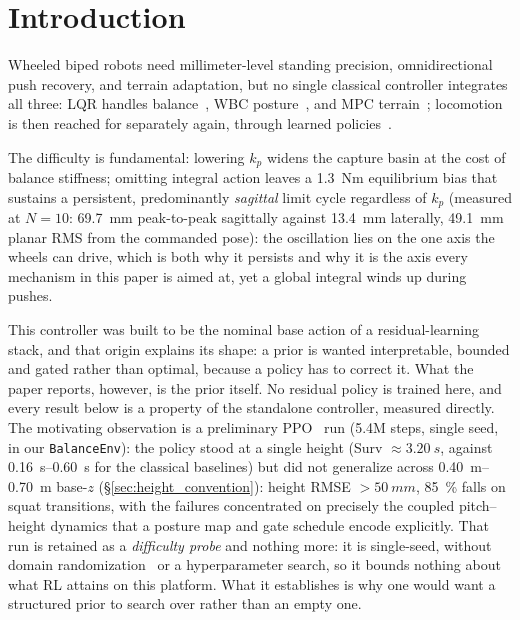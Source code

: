 \documentclass[conference]{IEEEtran}
\begin{document}
\section{Introduction}
\label{sec:intro}

Wheeled biped robots need millimeter-level standing precision, omnidirectional push recovery, and terrain adaptation, but no single classical controller integrates all three: LQR handles balance~\cite{klemm2019ascento}, WBC posture~\cite{klemm2020lqrwbc}, and MPC terrain~\cite{skater2024}; locomotion is then reached for separately again, through learned policies~\cite{hwangbo2019rl}.

The difficulty is fundamental: lowering $k_p$ widens the capture basin at the cost of balance stiffness; omitting integral action leaves a \SI{1.3}{Nm} equilibrium bias that sustains a persistent, predominantly \emph{sagittal} limit cycle regardless of $k_p$ (measured at $N{=}10$: \SI{69.7}{mm} peak-to-peak sagittally against \SI{13.4}{mm} laterally, \SI{49.1}{mm} planar RMS from the commanded pose): the oscillation lies on the one axis the wheels can drive, which is both why it persists and why it is the axis every mechanism in this paper is aimed at, yet a global integral winds up during pushes.

This controller was built to be the nominal base action of a residual-learning stack, and that origin explains its shape: a prior is wanted interpretable, bounded and gated rather than optimal, because a policy has to correct it. What the paper reports, however, is the prior itself. No residual policy is trained here, and every result below is a property of the standalone controller, measured directly. The motivating observation is a preliminary PPO~\cite{schulman2017ppo} run (5.4M steps, single seed, in our \texttt{BalanceEnv}): the policy stood at a single height (Surv ${\approx}\SI{3.20}{s}$, against \SIrange{0.16}{0.60}{s} for the classical baselines) but did not generalize across \SIrange{0.40}{0.70}{m} base-$z$ (\S\ref{sec:height_convention}): height RMSE ${>}\SI{50}{mm}$, \SI{85}{\percent} falls on squat transitions, with the failures concentrated on precisely the coupled pitch--height dynamics that a posture map and gate schedule encode explicitly. That run is retained as a \emph{difficulty probe} and nothing more: it is single-seed, without domain randomization~\cite{tobin2017domainrand,peng2018dynrand} or a hyperparameter search, so it bounds nothing about what RL attains on this platform. What it establishes is why one would want a structured prior to search over rather than an empty one.
\end{document}
